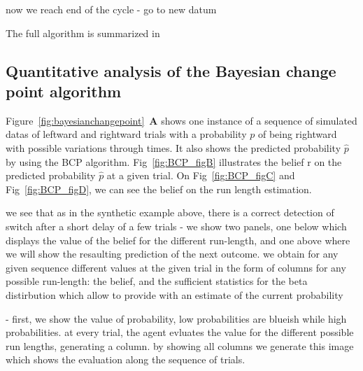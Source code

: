 \documentclass[profile,final,english,draft]{article}%
\newcommand{\seeFig}[1]{Figure~\ref{fig:#1}}
\begin{document}

now we reach end of the cycle - go to new datum

The full algorithm is summarized in%
\subsection{Quantitative analysis of the Bayesian change point algorithm}



%
%
%
%

\seeFig{bayesianchangepoint}~\textbf{A} shows one instance of a sequence of simulated datas of leftward and rightward trials with a probability $p$ of being rightward with possible variations through times. It also shows the predicted probability $\hat{p}$ by using the BCP algorithm. Fig~\ref{fig:BCP_figB} illustrates the belief r on the predicted probability $\hat{p}$ at a given trial. On Fig~\ref{fig:BCP_figC} and Fig~\ref{fig:BCP_figD}, we can see the belief on the run length estimation.

we see that as in the synthetic example above,
there is a correct detection of switch after a short delay of a few trials
- we show two panels, one below which displays the value of the belief for the different run-length, and one above where we will show the resaulting prediction of the next outcome.
we obtain for any given sequence different values at the given trial in the form of columns for any possible run-length: the belief,
and the sufficient statistics for the beta distirbution which allow to provide with an estimate of the current probability

- first, we show the value of probability, low probabilities are blueish while high probabilities. at every trial, the agent evluates the value for the different possible run lengths, generating a column. by showing all columns we generate this image which shows the evaluation along the sequence of trials.
\end{document}
